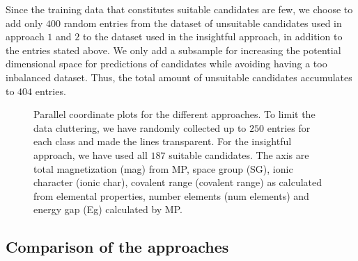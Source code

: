 Since the training data that constitutes suitable candidates are few, we choose to add only $400$ random entries from the dataset of unsuitable candidates used in approach $1$ and $2$ to the dataset used in the insightful approach, in addition to the entries stated above. We only add a subsample for increasing the potential dimensional space for predictions of candidates while avoiding having a too inbalanced dataset. Thus, the total amount of unsuitable candidates accumulates to $404$ entries.

\begin{figure}[ht!]
    \centering
    \begin{subfigure}{1\textwidth}
        \centering
          
    \end{subfigure}
    \begin{subfigure}{1\textwidth}
        \centering
          
    \end{subfigure}
    \begin{subfigure}{1\textwidth}
        \centering
          
    \end{subfigure}
    \vspace*{-95mm}
    \caption{Parallel coordinate plots for the different approaches. To limit the data cluttering, we have randomly collected up to $250$ entries for each class and made the lines transparent. For the insightful approach, we have used all $187$ suitable candidates. The axis are total magnetization (mag) from MP, space group (SG), ionic character (ionic char), covalent range (covalent range) as calculated from elemental properties, number elements (num elements) and energy gap (Eg) calculated by MP.}
    \label{fig:parallel-coordinates-approaches}
\end{figure}

\clearpage


\subsection{Comparison of the approaches}

